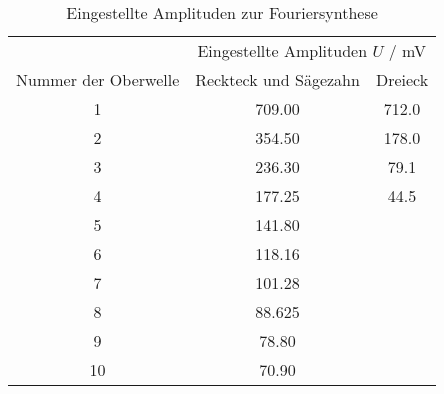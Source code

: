 \begin{table}[!htp]
\centering
\caption{Eingestellte Amplituden zur Fouriersynthese}
\label{tab:eingestellt}
\begin{tabular}{c c c}
\toprule
 & \multicolumn{2}{c}{Eingestellte Amplituden $U$ / mV } \\
 \cmidrule(lr){2-3}
{Nummer der Oberwelle} & {Reckteck und Sägezahn} & {Dreieck} \\
\midrule
1 & 709.00 & 712.0\\
2 & 354.50 & 178.0\\
3 & 236.30 & 79.1\\
4 & 177.25 & 44.5\\
5 & 141.80 & \\
6 & 118.16 & \\
7 & 101.28 & \\
8 & 88.625 & \\
9 & 78.80  & \\
10 & 70.90 & \\
\bottomrule
\end{tabular}
\end{table}